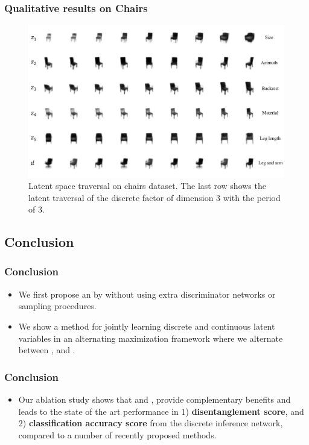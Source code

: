\documentclass[10pt,mathserif]{beamer}
\begin{document}
\begin{frame}
\frametitle{Qualitative results on Chairs}
\begin{figure}[htbp]
\centering
\includegraphics[width=\linewidth]{dis_asset/chairs}
\caption{Latent space traversal on chairs dataset. The last row shows the latent traversal of the discrete factor of dimension 3 with the period of 3.}
\label{fig:chairs_latent_traversal}
\end{figure}
\end{frame}

\subsection{Conclusion}

\begin{frame}
\frametitle{Conclusion}
\begin{itemize}\itemsep=12pt
        \item We first propose an {\color{blue}{efficient procedure for implicitly penalizing the total correlation}} by {\color{red}{controlling the information flow on each variables}} without using extra discriminator networks or sampling procedures.
\item We show a method for jointly learning discrete and continuous latent variables in an alternating maximization framework where we alternate between {\color{blue}{finding the most likely discrete configurations based on the continuous latent variables}}, and {\color{blue}{updating the inference parameters based on the discrete variables}}. 
\end{itemize}
\end{frame}

\begin{frame}
\frametitle{Conclusion}
\begin{itemize}
    \item Our ablation study shows that {\color{blue}{information cascading}} and {\color{blue}{alternating maximization of discrete and continuous variables}}, provide complementary benefits and leads to the state of the art performance in 1) \textbf{disentanglement score}, and 2) \textbf{classification accuracy score} from the discrete inference network, compared to a number of recently proposed methods.
\end{itemize}
\end{frame}
\end{document}
